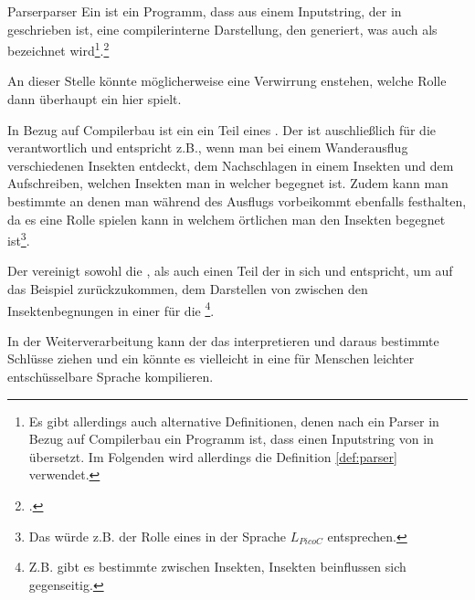 \begin{Definition}{Parser}{parser}
  Ein  ist ein Programm, dass aus einem Inputstring, der in  geschrieben ist, eine compilerinterne Darstellung, den  generiert, was auch als   bezeichnet wird\footnote{Es gibt allerdings auch alternative Definitionen, denen nach ein Parser in Bezug auf Compilerbau ein Programm ist, dass einen Inputstring von  in   übersetzt. Im Folgenden wird allerdings die Definition \ref{def:parser} verwendet.}.\footcite{noauthor_compiler_nodate}
\end{Definition}

\begin{Special_Paragraph}
  An dieser Stelle könnte möglicherweise eine Verwirrung enstehen, welche Rolle dann überhaupt ein  hier spielt.

  In Bezug auf Compilerbau ist ein  ein Teil eines . Der  ist auschließlich für die  verantwortlich und entspricht z.B., wenn man bei einem Wanderausflug verschiedenen Insekten entdeckt, dem Nachschlagen in einem Insekten und dem Aufschreiben, welchen Insekten man in welcher  begegnet ist. Zudem kann man bestimmte  an denen man während des Ausflugs vorbeikommt ebenfalls festhalten, da es eine Rolle spielen kann in welchem örtlichen  man den Insekten begegnet ist\footnote{Das würde z.B. der Rolle eines  \smalltt{;} in der Sprache $L_{PicoC}$ entsprechen.}.

  Der  vereinigt sowohl die , als auch einen Teil der  in sich und entspricht, um auf das Beispiel zurückzukommen, dem Darstellen von  zwischen den Insektenbegnungen in einer für die \footnote{Z.B. gibt es bestimmte  zwischen Insekten, Insekten beinflussen sich gegenseitig.}.

  In der Weiterverarbeitung kann der  das interpretieren und daraus bestimmte Schlüsse ziehen und ein   könnte es vielleicht in eine für Menschen leichter entschüsselbare Sprache kompilieren.
\end{Special_Paragraph}

